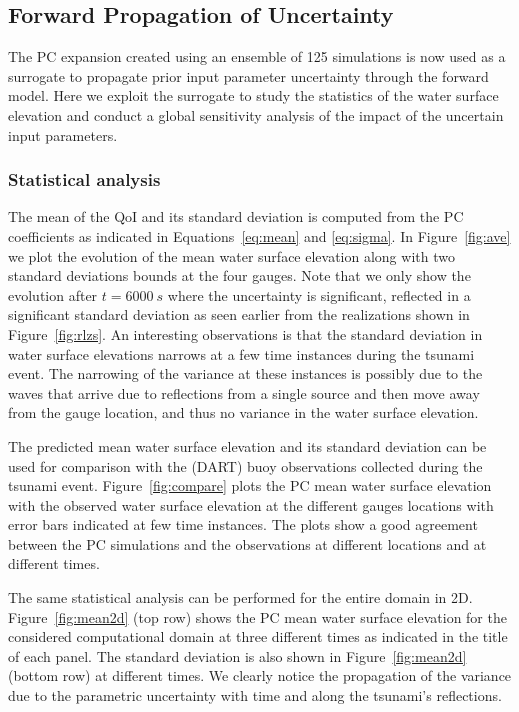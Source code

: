 \subsection{Forward Propagation of Uncertainty}
\label{sec:forward}
The PC expansion created using an ensemble of 125 \geoclaw simulations
is now used as a surrogate to propagate prior input parameter uncertainty 
through the forward model.  Here we exploit the surrogate 
to study the statistics of the water surface elevation and conduct 
a global sensitivity analysis of the impact of the uncertain input parameters.

\subsubsection{Statistical analysis}
The mean of the QoI and its standard deviation is computed
from the PC coefficients as indicated in Equations~\eqref{eq:mean} and \eqref{eq:sigma}. 
In Figure~\ref{fig:ave} we plot the evolution of
the mean water surface elevation along with two standard deviations
bounds at the four gauges.  
Note that we only show the evolution after $t=6000~s$ where the uncertainty is significant,
reflected in a significant standard deviation as seen earlier from the realizations shown 
in Figure~\ref{fig:rlzs}. An interesting observations is that the
standard deviation in water surface elevations narrows at a few time instances
during the tsunami event.  The narrowing of the variance at these instances is
possibly due to the waves that arrive due to reflections from a single source
and then move away from the gauge location, and thus no variance in the water
surface elevation.


The predicted mean water surface elevation  and its standard deviation 
can be used for comparison with the (DART) buoy observations collected during
the tsunami event. Figure~\ref{fig:compare} 
plots the PC mean water surface elevation with the observed 
water surface elevation at the different gauges locations
with error bars indicated at few time instances. 
The plots show a good agreement between the PC simulations and the 
observations at different locations and at different times. 

The same statistical analysis can be performed for the
entire domain in 2D. Figure~\ref{fig:mean2d} (top row) shows
the PC mean water surface elevation for the considered computational
domain at three different times as indicated in the title of each panel.
The standard deviation is also shown in Figure~\ref{fig:mean2d} (bottom row)
at different times. We clearly notice the propagation of the variance
due to the parametric uncertainty with time
and along the tsunami's reflections. 

